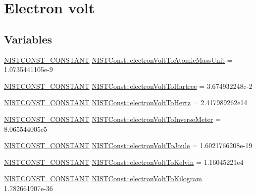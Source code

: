 \hypertarget{group___n_i_s_t_const-_electron_volt}{}\section{Electron volt}
\label{group___n_i_s_t_const-_electron_volt}
\subsection*{Variables}
\begin{DoxyCompactItemize}
\item 
\mbox{\hyperlink{group___n_i_s_t_const-_macros_ga2b0fc1d7452373f816175dd86ce26729}{N\+I\+S\+T\+C\+O\+N\+S\+T\+\_\+\+C\+O\+N\+S\+T\+A\+NT}} \mbox{\hyperlink{group___n_i_s_t_const-_electron_volt_ga62eaf49fce099edf5f51c125dc4dd927}{N\+I\+S\+T\+Const\+::electron\+Volt\+To\+Atomic\+Mass\+Unit}} = 1.\+0735441105e-\/9
\item 
\mbox{\hyperlink{group___n_i_s_t_const-_macros_ga2b0fc1d7452373f816175dd86ce26729}{N\+I\+S\+T\+C\+O\+N\+S\+T\+\_\+\+C\+O\+N\+S\+T\+A\+NT}} \mbox{\hyperlink{group___n_i_s_t_const-_electron_volt_ga31b4d719efdddf0a302918557df2ea95}{N\+I\+S\+T\+Const\+::electron\+Volt\+To\+Hartree}} = 3.\+674932248e-\/2
\item 
\mbox{\hyperlink{group___n_i_s_t_const-_macros_ga2b0fc1d7452373f816175dd86ce26729}{N\+I\+S\+T\+C\+O\+N\+S\+T\+\_\+\+C\+O\+N\+S\+T\+A\+NT}} \mbox{\hyperlink{group___n_i_s_t_const-_electron_volt_gae9b1b225f20da4725294b95a05ea82e0}{N\+I\+S\+T\+Const\+::electron\+Volt\+To\+Hertz}} = 2.\+417989262e14
\item 
\mbox{\hyperlink{group___n_i_s_t_const-_macros_ga2b0fc1d7452373f816175dd86ce26729}{N\+I\+S\+T\+C\+O\+N\+S\+T\+\_\+\+C\+O\+N\+S\+T\+A\+NT}} \mbox{\hyperlink{group___n_i_s_t_const-_electron_volt_ga333e07ed95192173791fcf53673f79ef}{N\+I\+S\+T\+Const\+::electron\+Volt\+To\+Inverse\+Meter}} = 8.\+065544005e5
\item 
\mbox{\hyperlink{group___n_i_s_t_const-_macros_ga2b0fc1d7452373f816175dd86ce26729}{N\+I\+S\+T\+C\+O\+N\+S\+T\+\_\+\+C\+O\+N\+S\+T\+A\+NT}} \mbox{\hyperlink{group___n_i_s_t_const-_electron_volt_ga214ec0b05df4113393bd1d3e631aebe6}{N\+I\+S\+T\+Const\+::electron\+Volt\+To\+Joule}} = 1.\+6021766208e-\/19
\item 
\mbox{\hyperlink{group___n_i_s_t_const-_macros_ga2b0fc1d7452373f816175dd86ce26729}{N\+I\+S\+T\+C\+O\+N\+S\+T\+\_\+\+C\+O\+N\+S\+T\+A\+NT}} \mbox{\hyperlink{group___n_i_s_t_const-_electron_volt_gaaac3cf941012add952f4aee0c72f0a42}{N\+I\+S\+T\+Const\+::electron\+Volt\+To\+Kelvin}} = 1.\+16045221e4
\item 
\mbox{\hyperlink{group___n_i_s_t_const-_macros_ga2b0fc1d7452373f816175dd86ce26729}{N\+I\+S\+T\+C\+O\+N\+S\+T\+\_\+\+C\+O\+N\+S\+T\+A\+NT}} \mbox{\hyperlink{group___n_i_s_t_const-_electron_volt_gac875b0f36fd52d70256d4a3d86eebb2e}{N\+I\+S\+T\+Const\+::electron\+Volt\+To\+Kilogram}} = 1.\+782661907e-\/36
\end{DoxyCompactItemize}


